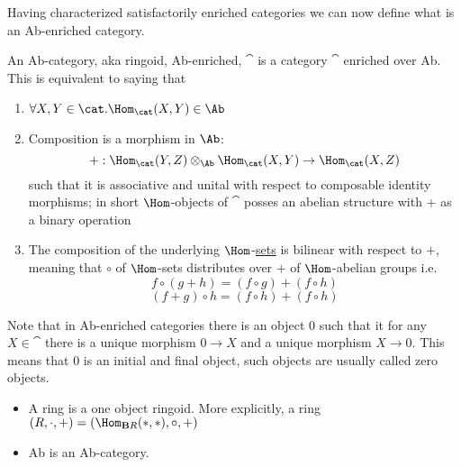 Having characterized satisfactorily enriched categories we can now define what is an Ab-enriched category.
\begin{defn}[Ab-Category]\label{Ab-Enriched Cat}
    An Ab-category, aka ringoid, Ab-enriched, $\cat$ is a category $\cat$ enriched over Ab. This is equivalent
    to saying that
    \begin{enumerate}
        \item $\forall X,Y\in\cat.\Hom_{\cat}(X,Y)\in\Ab$
        \item Composition is a morphism in $\Ab$: $$+:\Hom_\cat(Y,Z)\otimes_{\Ab} \Hom_\cat(X,Y)\to\Hom_\cat(X,Z)$$ such that it is associative and unital with respect to composable identity morphisms; in short $\Hom$-objects of $\cat$ posses an abelian structure with + as a binary operation
        \item The composition of the underlying $\Hom$-\underline{sets} is bilinear with respect to $+$, meaning that $\circ$ of $\Hom$-sets distributes over $+$ of $\Hom$-abelian groups i.e. $$f\circ(g+h)=(f\circ g)+(f\circ h)$$ $$(f+g)\circ h=(f\circ h)+(f\circ h)$$
    \end{enumerate}
\end{defn}
\begin{rem}
    Note that in Ab-enriched categories there is an object $0$ such that it for any $X\in\cat$ there is a unique
    morphism $0\to X$ and a unique morphism $X\to 0$. This means that 0 is an initial and final object,
    such objects are usually called zero objects.
\end{rem}
\begin{ex}
    \hfill
    \begin{itemize}
        \item A ring is a one object ringoid. More explicitly, a ring $(R,\cdot,+)=(\Hom_{\mathbf{B}R}(\ast,\ast),\circ,+)$  
        \item Ab is an Ab-category.
    \end{itemize}
\end{ex}


